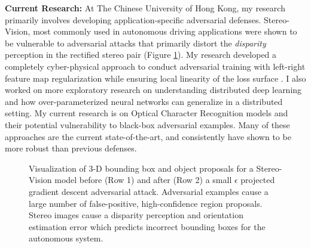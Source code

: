 \documentclass[11pt]{article}
\begin{document}
\textbf{Current Research:} At The Chinese University of Hong Kong, my research primarily involves developing application-specific adversarial defenses. Stereo-Vision, most commonly used in autonomous driving applications were shown to be vulnerable to adversarial attacks that primarily distort the \emph{disparity} perception in the rectified stereo pair (Figure \ref{1}). My research developed a completely cyber-physical approach to conduct adversarial training with left-right feature map regularization while ensuring local linearity of the loss surface \cite{me}. I also worked on more exploratory research on understanding distributed deep learning and how over-parameterized neural networks can generalize in a distributed setting. My current research is on Optical Character Recognition models and their potential vulnerability to black-box adversarial examples. Many of these approaches are the current state-of-the-art, and consistently have shown to be more robust than previous defenses.  \\

\begin{figure}
	  \caption{\label{1} \footnotesize{Visualization of 3-D bounding box and object proposals for a Stereo-Vision model before (Row 1) and after (Row 2) a small $\epsilon$ projected gradient descent adversarial attack. Adversarial examples cause a large number of false-positive, high-confidence region proposals. Stereo images cause a disparity perception and orientation estimation error which predicts incorrect bounding boxes for the autonomous system.}}
	\end{figure}
\end{document}
